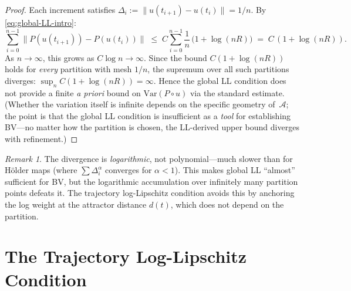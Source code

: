 \documentclass[12pt,a4paper]{article}
\theoremstyle{definition}
\theoremstyle{plain}
\theoremstyle{remark}
\newtheorem{remark}[definition]{Remark}
\newcommand{\Var}{\mathrm{Var}}
\begin{document}
\begin{proof}
Each increment satisfies $\Delta_i := \|u(t_{i+1}) - u(t_i)\| = 1/n$.
By \eqref{eq:global-LL-intro}:
\[
  \sum_{i=0}^{n-1} \|P(u(t_{i+1})) - P(u(t_i))\|
  \;\le\;
  C \sum_{i=0}^{n-1} \frac{1}{n}\,
  \bigl(1 + \log(nR)\bigr)
  \;=\;
  C\,(1 + \log(nR)).
\]
As $n \to \infty$, this grows as $C\log n \to \infty$.
Since the bound $C(1 + \log(nR))$ holds for \emph{every}
partition with mesh $1/n$, the supremum over all such
partitions diverges: $\sup_n C(1 + \log(nR)) = \infty$.
Hence the global LL condition does not provide a finite
\emph{a priori} bound on $\Var(P \circ u)$ via the standard
estimate.  (Whether the variation itself is infinite depends
on the specific geometry of~$\mathcal{A}$; the point is that
the global LL condition is insufficient as a \emph{tool} for
establishing BV---no matter how the partition is chosen, the
LL-derived upper bound diverges with refinement.)
\end{proof}

\begin{remark}
The divergence is \emph{logarithmic}, not polynomial---much slower
than for Hölder maps (where $\sum \Delta_i^\alpha$ converges for
$\alpha < 1$).  This makes global LL ``almost'' sufficient for BV,
but the logarithmic accumulation over infinitely many partition
points defeats it.  The trajectory log-Lipschitz condition avoids
this by anchoring the log weight at the attractor distance $d(t)$,
which does not depend on the partition.
\end{remark}


\section{The Trajectory Log-Lipschitz Condition}
\label{sec:TLL}
\end{document}
